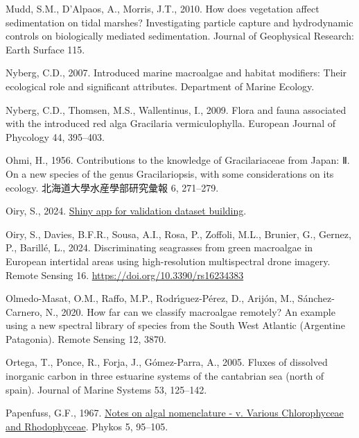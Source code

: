 \documentclass[
  letterpaper,
  DIV=11,
  numbers=noendperiod]{scrartcl}
\newlength{\cslhangindent}
\newenvironment{CSLReferences}[2] %
 {\begin{list}{}{%
  \setlength{\itemindent}{0pt}
  \setlength{\leftmargin}{0pt}
  \setlength{\parsep}{0pt}
  \ifodd #1
   \setlength{\leftmargin}{\cslhangindent}
   \setlength{\itemindent}{-1\cslhangindent}
  \fi
  \setlength{\itemsep}{#2\baselineskip}}}
 {\end{list}}
\begin{document}
\begin{CSLReferences}{1}{0}
Mudd, S.M., D'Alpaos, A., Morris, J.T., 2010. How does vegetation affect
sedimentation on tidal marshes? Investigating particle capture and
hydrodynamic controls on biologically mediated sedimentation. Journal of
Geophysical Research: Earth Surface 115.

Nyberg, C.D., 2007. Introduced marine macroalgae and habitat modifiers:
Their ecological role and significant attributes. Department of Marine
Ecology.

Nyberg, C.D., Thomsen, M.S., Wallentinus, I., 2009. Flora and fauna
associated with the introduced red alga {G}racilaria vermiculophylla.
European Journal of Phycology 44, 395--403.

Ohmi, H., 1956. Contributions to the knowledge of {G}racilariaceae from
{J}apan: Ⅱ. On a new species of the genus {G}racilariopsis, with some
considerations on its ecology. 北海道大學水産學部研究彙報 6, 271--279.

Oiry, S., 2024.
\href{https://oirysimon.shinyapps.io/shiny_validate/}{Shiny app for
validation dataset building}.

Oiry, S., Davies, B.F.R., Sousa, A.I., Rosa, P., Zoffoli, M.L., Brunier,
G., Gernez, P., Barillé, L., 2024. Discriminating seagrasses from green
macroalgae in {E}uropean intertidal areas using high-resolution
multispectral drone imagery. Remote Sensing 16.
\url{https://doi.org/10.3390/rs16234383}

Olmedo-Masat, O.M., Raffo, M.P., Rodrı́guez-Pérez, D., Arijón, M.,
Sánchez-Carnero, N., 2020. How far can we classify macroalgae remotely?
An example using a new spectral library of species from the {S}outh
{W}est {A}tlantic ({A}rgentine {P}atagonia). Remote Sensing 12, 3870.

Ortega, T., Ponce, R., Forja, J., Gómez-Parra, A., 2005. Fluxes of
dissolved inorganic carbon in three estuarine systems of the cantabrian
sea (north of spain). Journal of Marine Systems 53, 125--142.

Papenfuss, G.F., 1967.
\href{https://marinespecies.org/aphia.php?p=sourcedetails&id=303450}{Notes
on algal nomenclature - v. Various {C}hlorophyceae and {R}hodophyceae}.
Phykos 5, 95--105.


\end{CSLReferences}
\end{document}
